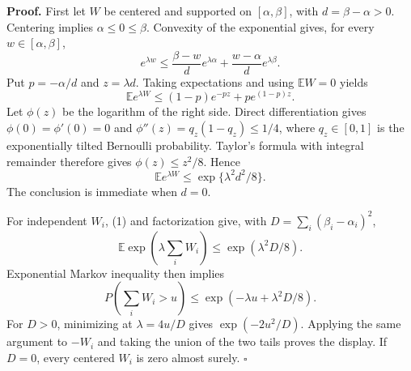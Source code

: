 \textbf{Proof.}
First let \(W\) be centered and supported on \([\alpha,\beta]\), with \(d=\beta-\alpha>0\). Centering implies \(\alpha\le0\le\beta\). Convexity of the exponential gives, for every \(w\in[\alpha,\beta]\),
\[
e^{\lambda w}\le\frac{\beta-w}{d}e^{\lambda\alpha}+\frac{w-\alpha}{d}e^{\lambda\beta}.
\]
Put \(p=-\alpha/d\) and \(z=\lambda d\). Taking expectations and using \(\mathbb E W=0\) yields
\[
\mathbb E e^{\lambda W}\le(1-p)e^{-pz}+pe^{(1-p)z}.
\]
Let \(\phi(z)\) be the logarithm of the right side. Direct differentiation gives \(\phi(0)=\phi'(0)=0\) and \(\phi''(z)=q_z(1-q_z)\le1/4\), where \(q_z\in[0,1]\) is the exponentially tilted Bernoulli probability. Taylor's formula with integral remainder therefore gives \(\phi(z)\le z^2/8\). Hence
\[
\mathbb E e^{\lambda W}\le\exp\{\lambda^2d^2/8\}.
\tag{1}
\]
The conclusion is immediate when \(d=0\).

For independent \(W_i\), (1) and factorization give, with \(D=\sum_i(\beta_i-\alpha_i)^2\),
\[
\mathbb E\exp\!\left(\lambda\sum_iW_i\right)\le\exp(\lambda^2D/8).
\]
Exponential Markov inequality then implies
\[
P\!\left(\sum_iW_i>u\right)\le\exp(-\lambda u+\lambda^2D/8).
\]
For \(D>0\), minimizing at \(\lambda=4u/D\) gives \(\exp(-2u^2/D)\). Applying the same argument to \(-W_i\) and taking the union of the two tails proves the display. If \(D=0\), every centered \(W_i\) is zero almost surely. \(\square\)